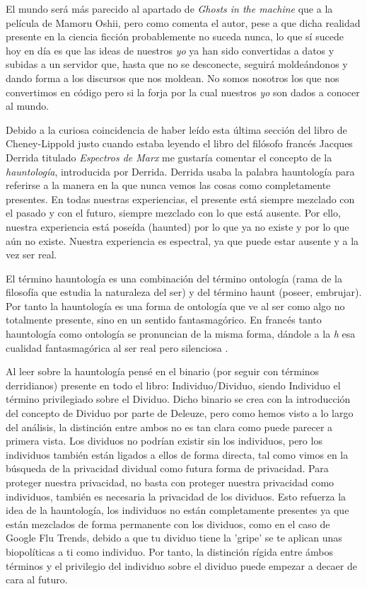 \documentclass[11pt]{article}
\begin{document}
El mundo será más parecido al apartado de \textit{Ghosts in the machine} que a la película de Mamoru Oshii, pero como comenta el autor, pese a que dicha realidad presente en la ciencia ficción probablemente no suceda nunca, lo que sí sucede hoy en día es que las ideas de nuestros \textit{yo} ya han sido convertidas a datos y subidas a un servidor que, hasta que no se desconecte, seguirá moldeándonos y dando forma a los discursos que nos moldean. No somos nosotros los que nos convertimos en código pero si la forja por la cual nuestros \textit{yo} son dados a conocer al mundo.

Debido a la curiosa coincidencia de haber leído esta última sección del libro de Cheney-Lippold justo cuando estaba leyendo el libro del filósofo francés Jacques Derrida titulado \textit{Espectros de Marx} me gustaría comentar el concepto de la \textit{hauntología}, introducida por Derrida. Derrida usaba la palabra hauntología para referirse a la manera en la que nunca vemos las cosas como completamente presentes. En todas nuestras experiencias, el presente está siempre mezclado con el pasado y con el futuro, siempre mezclado con lo que está ausente. Por ello, nuestra experiencia está poseída (haunted) por lo que ya no existe y por lo que aún no existe. Nuestra experiencia es espectral, ya que puede estar ausente y a la vez ser real.

El término hauntología es una combinación del término ontología (rama de la filosofía que estudia la naturaleza del ser) y del término haunt (poseer, embrujar). Por tanto la hauntología es una forma de ontología que ve al ser como algo no totalmente presente, sino en un sentido fantasmagórico. En francés tanto hauntología como ontología se pronuncian de la misma forma, dándole a la \textit{h} esa cualidad fantasmagórica al ser real pero silenciosa \cite{cp-hauntology}.

Al leer sobre la hauntología pensé en el binario (por seguir con términos derridianos) presente en todo el libro: Individuo/Dividuo, siendo Individuo el término privilegiado sobre el Dividuo. Dicho binario se crea con la introducción del concepto de Dividuo por parte de Deleuze, pero como hemos visto a lo largo del análisis, la distinción entre ambos no es tan clara como puede parecer a primera vista. Los dividuos no podrían existir sin los individuos, pero los individuos también están ligados a ellos de forma directa, tal como vimos en la búsqueda de la privacidad dividual como futura forma de privacidad. Para proteger nuestra privacidad, no basta con proteger nuestra privacidad como individuos, también es necesaria la privacidad de los dividuos. Esto refuerza la idea de la hauntología, los individuos no están completamente presentes ya que están mezclados de forma permanente con los dividuos, como en el caso de Google Flu Trends, debido a que tu dividuo tiene la 'gripe' se te aplican unas biopolíticas a ti como individuo. Por tanto, la distinción rígida entre ámbos términos y el privilegio del individuo sobre el dividuo puede empezar a decaer de cara al futuro.
\end{document}
